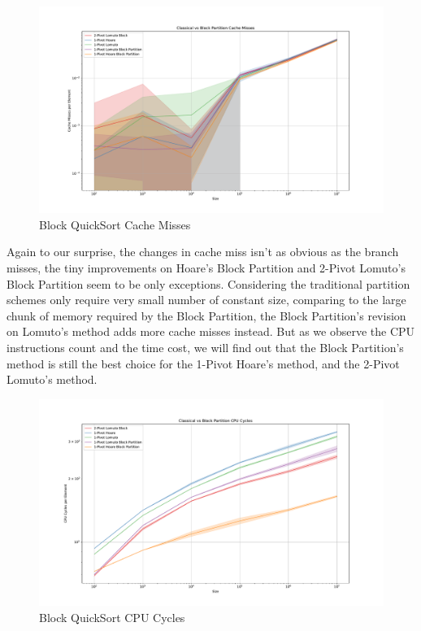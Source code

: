 \documentclass{article}
\begin{document}
\begin{figure}[H]
    \hypertarget{fig:blockcachemiss}{}
    \caption{Block QuickSort Cache Misses}
    \centering
    \hspace*{-0.27\textwidth}
    \includegraphics[width=1.5\textwidth]{Classical vs Block Partition Cache Misses.pdf}
\end{figure}

Again to our surprise, the changes in cache miss isn't as obvious as the branch misses, the tiny improvements on Hoare's Block Partition and 2-Pivot Lomuto's Block Partition seem to be only exceptions.
Considering the traditional partition schemes only require very small number of constant size, comparing to the large chunk of memory required by the Block Partition, the Block Partition's revision on Lomuto's method adds more cache misses instead.
But as we observe the CPU instructions count and the time cost, we will find out that the Block Partition's method is still the best choice for the 1-Pivot Hoare's method, and the 2-Pivot Lomuto's method.

\begin{figure}[H]
    \hypertarget{fig:blockcpucycles}{}
    \caption{Block QuickSort CPU Cycles}
    \centering
    \hspace*{-0.27\textwidth}
    \includegraphics[width=1.5\textwidth]{Classical vs Block Partition CPU Cycles.pdf}
\end{figure}
\end{document}

